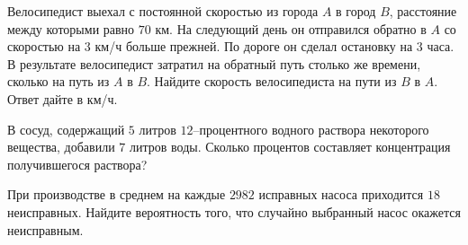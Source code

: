 \begin{class}[number=1]
\begin{listofex}
\begin{minipage}[c]{0.3\textwidth}
		\end{minipage}
		\item Велосипедист выехал с постоянной скоростью из города \( A \) в город \( B \), расстояние между
		которыми равно \( 70 \) км. На следующий день он отправился обратно в \( A \) со скоростью на \( 3 \) км/ч больше прежней. По дороге он сделал остановку на \( 3 \) часа. В результате велосипедист затратил на обратный путь столько же времени, сколько на путь из \( A \) в \( B \). Найдите скорость велосипедиста на пути из \( B \) в \( A \). Ответ дайте в км/ч.
		\item В сосуд, содержащий \( 5 \) литров \( 12 \)--процентного водного раствора некоторого вещества,
		добавили \( 7 \) литров воды. Сколько процентов составляет концентрация получившегося раствора?
		\item При производстве в среднем на каждые \( 2982 \) исправных насоса приходится \( 18 \) неисправных.
		Найдите вероятность того, что случайно выбранный насос окажется неисправным.
	\end{listofex}
\end{class}
%
%
%
%
%
%
%
%
%
%

